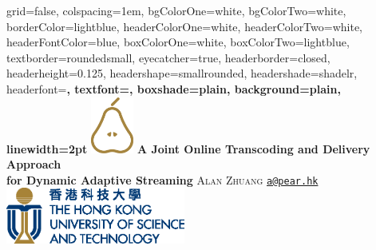 \documentclass[landscape,final,a0paper,fontscale=0.285]{baposter}
\begin{document}
\begin{poster}%
  {
  grid=false,
  colspacing=1em,
  bgColorOne=white,
  bgColorTwo=white,
  borderColor=lightblue,
  headerColorOne=white,%
  headerColorTwo=white,%
  headerFontColor=blue,%
  boxColorOne=white,
  boxColorTwo=lightblue,
  textborder=roundedsmall,%
  eyecatcher=true,
  headerborder=closed,
  headerheight=0.125\textheight,
  headershape=smallrounded,
  headershade=shadelr,
  headerfont=\Large\bf\textsc, %
  textfont={\setlength{\parindent}{1.5em}},
  boxshade=plain,
  background=plain,
  linewidth=2pt
  }
  {\includegraphics[height=5em]{logo/PearLogo.eps}} 
  {\bf{A Joint Online Transcoding and Delivery Approach\\ for Dynamic Adaptive Streaming}\vspace{0.25em}}
  {\textsc{ Alan Zhuang      }  \href{mailto:a@pear.hk}{\nolinkurl{a@pear.hk}}}
  {%
    \includegraphics[height=5em]{logo/UST4C_L4.eps}
  }

    \newcommand{\colouredcircle}{%
      \tikz{\useasboundingbox (-0.2em,-0.32em) rectangle(0.2em,0.32em); \draw[draw=black,fill=lightblue,line width=0.03em] (0,0) circle(0.18em);}}


\end{poster}
\end{document}
